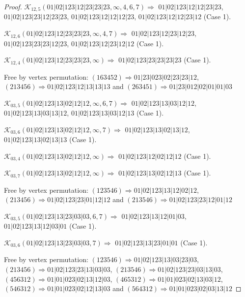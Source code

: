\documentclass[12pt]{article}
\theoremstyle{plain}
\theoremstyle{definition}
\theoremstyle{remark}
\newcommand{\fancy}[1]{\mathcal{#1}}
\def\K{\fancy{K}}
\begin{document}
\begin{proof}
	$\K_{12,5}(01|02|123|12|23|23|23,\infty,4, 6, 7)\Rightarrow $ $01|02|123|12|12|23|23$, $01|02|123|23|12|23|23$, $01|02|123|12|12|12|23$, $01|02|123|12|12|23|12$ (Case 1).
	
	$\K_{12,6}(01|02|123|12|23|23|23,\infty,4, 7)\Rightarrow $ $01|02|123|12|23|12|23$, $01|02|123|23|23|12|23$, $01|02|123|12|23|12|12$ (Case 1).
	
	$\K_{12,4}(01|02|123|12|23|23|23,\infty)\Rightarrow $ $01|02|123|23|23|23|23$ (Case 1).
	
	
	
	Free by vertex permutation: $(1 6 3 4 5 2)\Rightarrow 01|23|023|02|23|23|12$, $(2 1 3 4 5 6)\Rightarrow 01|02|123|12|13|13|13$ and $(2 6 3 4 5 1)\Rightarrow 01|23|012|02|01|01|03$
	
	
	
	\bigskip
	
	$\K_{03,5}(01|02|123|13|02|12|12,\infty,6, 7)\Rightarrow $ $01|02|123|13|03|12|12$, $01|02|123|13|03|13|12$, $01|02|123|13|03|12|13$ (Case 1).
	
	$\K_{03,6}(01|02|123|13|02|12|12,\infty,7)\Rightarrow $ $01|02|123|13|02|13|12$, $01|02|123|13|02|13|13$ (Case 1).
	
	$\K_{03,4}(01|02|123|13|02|12|12,\infty)\Rightarrow $ $01|02|123|12|02|12|12$ (Case 1).
	
	$\K_{03,7}(01|02|123|13|02|12|12,\infty)\Rightarrow $ $01|02|123|13|02|12|13$ (Case 1).
	
	
	
	Free by vertex permutation: $(1 2 3 5 4 6)\Rightarrow 01|02|123|13|12|02|12$, $(2 1 3 4 5 6)\Rightarrow 01|02|123|23|01|12|12$ and $(2 1 3 5 4 6)\Rightarrow 01|02|123|23|12|01|12$
	
	
	
	\bigskip
	
	$\K_{03,5}(01|02|123|13|23|03|03,6, 7)\Rightarrow $ $01|02|123|13|12|01|03$, $01|02|123|13|12|03|01$ (Case 1).
	
	$\K_{03,6}(01|02|123|13|23|03|03,7)\Rightarrow $ $01|02|123|13|23|01|01$ (Case 1).
	
	
	
	Free by vertex permutation: $(1 2 3 5 4 6)\Rightarrow 01|02|123|13|03|23|03$, $(2 1 3 4 5 6)\Rightarrow 01|02|123|23|13|03|03$, $(2 1 3 5 4 6)\Rightarrow 01|02|123|23|03|13|03$, $(4 5 6 3 1 2)\Rightarrow 01|01|023|02|13|12|03$, $(4 6 5 3 1 2)\Rightarrow 01|01|023|02|13|03|12$, $(5 4 6 3 1 2)\Rightarrow 01|01|023|02|12|13|03$ and $(5 6 4 3 1 2)\Rightarrow 01|01|023|02|03|13|12$
	

\end{proof}
\end{document}

